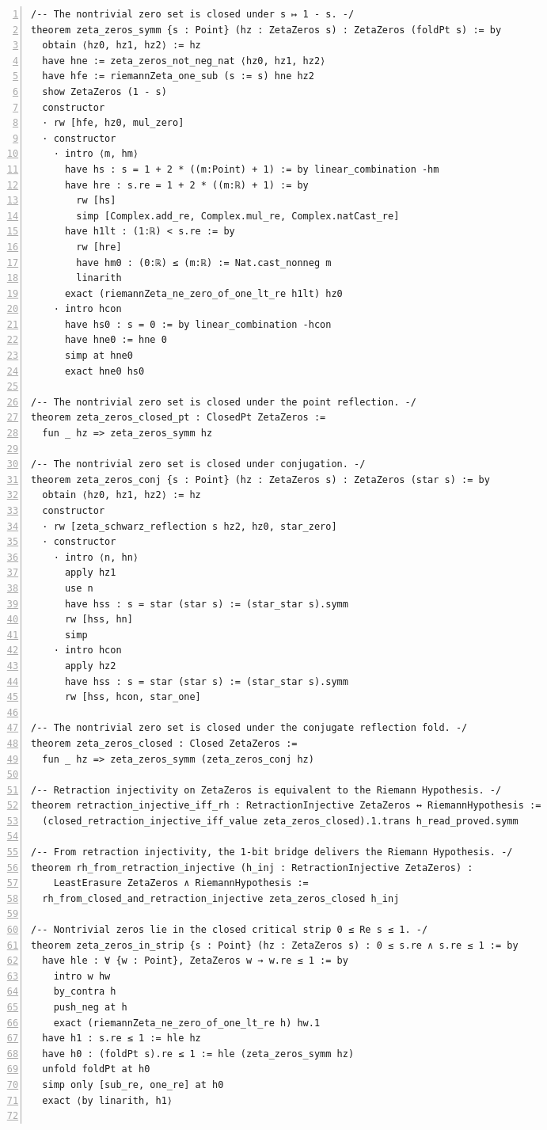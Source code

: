 \documentclass[10pt]{article}
\newcommand{\leansize}{\fontsize{5.5pt}{6.75pt}\selectfont}
\begin{document}
\begin{multicols}{2}
\begin{Verbatim}[numbers=left,firstnumber=1,numbersep=3pt,xleftmargin=2.6em,breaklines=true,breakanywhere=true,breakautoindent=false,breakindent=1.4em,breaksymbolleft={},breakanywheresymbolpre={},fontsize=\leansize]
/-- The nontrivial zero set is closed under s ↦ 1 - s. -/
theorem zeta_zeros_symm {s : Point} (hz : ZetaZeros s) : ZetaZeros (foldPt s) := by
  obtain ⟨hz0, hz1, hz2⟩ := hz
  have hne := zeta_zeros_not_neg_nat ⟨hz0, hz1, hz2⟩
  have hfe := riemannZeta_one_sub (s := s) hne hz2
  show ZetaZeros (1 - s)
  constructor
  · rw [hfe, hz0, mul_zero]
  · constructor
    · intro ⟨m, hm⟩
      have hs : s = 1 + 2 * ((m:Point) + 1) := by linear_combination -hm
      have hre : s.re = 1 + 2 * ((m:ℝ) + 1) := by
        rw [hs]
        simp [Complex.add_re, Complex.mul_re, Complex.natCast_re]
      have h1lt : (1:ℝ) < s.re := by
        rw [hre]
        have hm0 : (0:ℝ) ≤ (m:ℝ) := Nat.cast_nonneg m
        linarith
      exact (riemannZeta_ne_zero_of_one_lt_re h1lt) hz0
    · intro hcon
      have hs0 : s = 0 := by linear_combination -hcon
      have hne0 := hne 0
      simp at hne0
      exact hne0 hs0

/-- The nontrivial zero set is closed under the point reflection. -/
theorem zeta_zeros_closed_pt : ClosedPt ZetaZeros :=
  fun _ hz => zeta_zeros_symm hz

/-- The nontrivial zero set is closed under conjugation. -/
theorem zeta_zeros_conj {s : Point} (hz : ZetaZeros s) : ZetaZeros (star s) := by
  obtain ⟨hz0, hz1, hz2⟩ := hz
  constructor
  · rw [zeta_schwarz_reflection s hz2, hz0, star_zero]
  · constructor
    · intro ⟨n, hn⟩
      apply hz1
      use n
      have hss : s = star (star s) := (star_star s).symm
      rw [hss, hn]
      simp
    · intro hcon
      apply hz2
      have hss : s = star (star s) := (star_star s).symm
      rw [hss, hcon, star_one]

/-- The nontrivial zero set is closed under the conjugate reflection fold. -/
theorem zeta_zeros_closed : Closed ZetaZeros :=
  fun _ hz => zeta_zeros_symm (zeta_zeros_conj hz)

/-- Retraction injectivity on ZetaZeros is equivalent to the Riemann Hypothesis. -/
theorem retraction_injective_iff_rh : RetractionInjective ZetaZeros ↔ RiemannHypothesis :=
  (closed_retraction_injective_iff_value zeta_zeros_closed).1.trans h_read_proved.symm

/-- From retraction injectivity, the 1-bit bridge delivers the Riemann Hypothesis. -/
theorem rh_from_retraction_injective (h_inj : RetractionInjective ZetaZeros) :
    LeastErasure ZetaZeros ∧ RiemannHypothesis :=
  rh_from_closed_and_retraction_injective zeta_zeros_closed h_inj

/-- Nontrivial zeros lie in the closed critical strip 0 ≤ Re s ≤ 1. -/
theorem zeta_zeros_in_strip {s : Point} (hz : ZetaZeros s) : 0 ≤ s.re ∧ s.re ≤ 1 := by
  have hle : ∀ {w : Point}, ZetaZeros w → w.re ≤ 1 := by
    intro w hw
    by_contra h
    push_neg at h
    exact (riemannZeta_ne_zero_of_one_lt_re h) hw.1
  have h1 : s.re ≤ 1 := hle hz
  have h0 : (foldPt s).re ≤ 1 := hle (zeta_zeros_symm hz)
  unfold foldPt at h0
  simp only [sub_re, one_re] at h0
  exact ⟨by linarith, h1⟩


\end{Verbatim}
\end{multicols}
\end{document}
